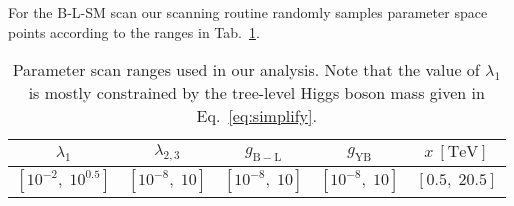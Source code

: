 For the B-L-SM scan our scanning routine randomly samples parameter space points according to the ranges in Tab.~\ref{tab:scan}.
%
\begin{table}[H]
	\begin{center}
		\begin{tabular}{ccccc}
			\toprule                     
			$\lambda_{1}$ & $\lambda_{2,3}$ & $g_{\mathrm{B-L}}$ & $g_{\mathrm{YB}}$ & $x~{\mathrm{[TeV]}}$  
			\\       
						\midrule 
			$\left[10^{-2},\; 10^{0.5}
			\right]$ 			    							& $\left[10^{-8},\; 10
			\right]$ 			    							& $\left[10^{-8},\; 10
			\right]$		& $\left[10^{-8},\; 10
			\right]$	&	$\left[0.5,\; 20.5
			\right]$ 	\\
			\bottomrule
		\end{tabular}  
		\caption{Parameter scan ranges used in our analysis. Note that the value of $\lambda_1$ is mostly constrained by the tree-level Higgs boson mass given in Eq.~\eqref{eq:simplify}. 
		}
		\label{tab:scan}
	\end{center}
\end{table}
%  
%
%
%
%
%
% 
%

